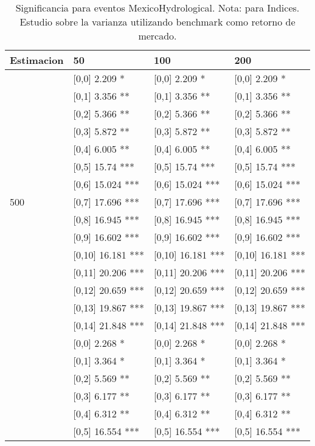 \begin{table}

\caption{Significancia para eventos MexicoHydrological. Nota: para Indices. Estudio sobre la varianza utilizando benchmark como retorno de mercado.}
\centering
\begin{tabular}[t]{llll}
\toprule
Estimacion & 50 & 100 & 200\\
\midrule
 & {}[0,0] 2.209 * & {}[0,0] 2.209 * & {}[0,0] 2.209 *\\
 & {}[0,1] 3.356 ** & {}[0,1] 3.356 ** & {}[0,1] 3.356 **\\
 & {}[0,2] 5.366 ** & {}[0,2] 5.366 ** & {}[0,2] 5.366 **\\
 & {}[0,3] 5.872 ** & {}[0,3] 5.872 ** & {}[0,3] 5.872 **\\
 & {}[0,4] 6.005 ** & {}[0,4] 6.005 ** & {}[0,4] 6.005 **\\
\addlinespace
 & {}[0,5] 15.74 *** & {}[0,5] 15.74 *** & {}[0,5] 15.74 ***\\
 & {}[0,6] 15.024 *** & {}[0,6] 15.024 *** & {}[0,6] 15.024 ***\\
500 & {}[0,7] 17.696 *** & {}[0,7] 17.696 *** & {}[0,7] 17.696 ***\\
 & {}[0,8] 16.945 *** & {}[0,8] 16.945 *** & {}[0,8] 16.945 ***\\
 & {}[0,9] 16.602 *** & {}[0,9] 16.602 *** & {}[0,9] 16.602 ***\\
\addlinespace
 & {}[0,10] 16.181 *** & {}[0,10] 16.181 *** & {}[0,10] 16.181 ***\\
 & {}[0,11] 20.206 *** & {}[0,11] 20.206 *** & {}[0,11] 20.206 ***\\
 & {}[0,12] 20.659 *** & {}[0,12] 20.659 *** & {}[0,12] 20.659 ***\\
 & {}[0,13] 19.867 *** & {}[0,13] 19.867 *** & {}[0,13] 19.867 ***\\
 & {}[0,14] 21.848 *** & {}[0,14] 21.848 *** & {}[0,14] 21.848 ***\\
\addlinespace
 & {}[0,0] 2.268 * & {}[0,0] 2.268 * & {}[0,0] 2.268 *\\
 & {}[0,1] 3.364 * & {}[0,1] 3.364 * & {}[0,1] 3.364 *\\
 & {}[0,2] 5.569 ** & {}[0,2] 5.569 ** & {}[0,2] 5.569 **\\
 & {}[0,3] 6.177 ** & {}[0,3] 6.177 ** & {}[0,3] 6.177 **\\
 & {}[0,4] 6.312 ** & {}[0,4] 6.312 ** & {}[0,4] 6.312 **\\
\addlinespace
 & {}[0,5] 16.554 *** & {}[0,5] 16.554 *** & {}[0,5] 16.554 ***\\

\end{tabular}
\end{table}
